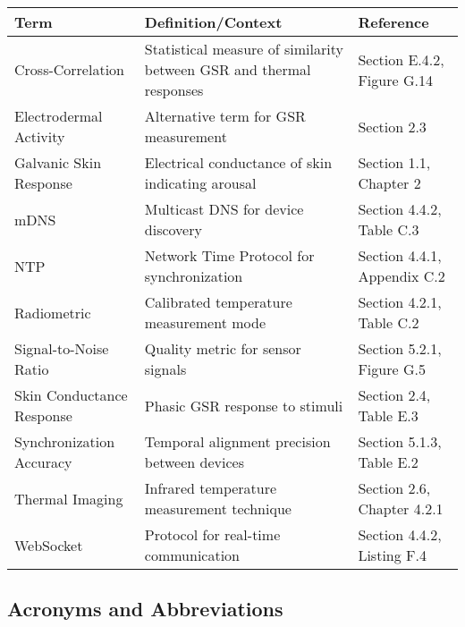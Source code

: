 \begin{longtable}{|l|p{8cm}|l|}
\hline
\textbf{Term} & \textbf{Definition/Context} & \textbf{Reference} \\
\hline
\endhead
Cross-Correlation & Statistical measure of similarity between GSR and thermal responses & Section E.4.2, Figure G.14 \\
Electrodermal Activity & Alternative term for GSR measurement & Section 2.3 \\
Galvanic Skin Response & Electrical conductance of skin indicating arousal & Section 1.1, Chapter 2 \\
mDNS & Multicast DNS for device discovery & Section 4.4.2, Table C.3 \\
NTP & Network Time Protocol for synchronization & Section 4.4.1, Appendix C.2 \\
Radiometric & Calibrated temperature measurement mode & Section 4.2.1, Table C.2 \\
Signal-to-Noise Ratio & Quality metric for sensor signals & Section 5.2.1, Figure G.5 \\
Skin Conductance Response & Phasic GSR response to stimuli & Section 2.4, Table E.3 \\
Synchronization Accuracy & Temporal alignment precision between devices & Section 5.1.3, Table E.2 \\
Thermal Imaging & Infrared temperature measurement technique & Section 2.6, Chapter 4.2.1 \\
WebSocket & Protocol for real-time communication & Section 4.4.2, Listing F.4 \\
\hline
\end{longtable}

\subsection{Acronyms and Abbreviations}


